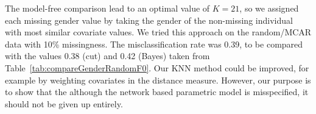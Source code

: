 \documentclass{article}
\begin{document}
%
%

The model-free comparison lead to an optimal value of $K=21$, so we assigned each missing gender value by taking the gender of the non-missing individual with most similar covariate values. We tried this approach on the random/MCAR data with 10\% missingness. The misclassification rate was 0.39, to be compared with the values 0.38 (cut) and 0.42 (Bayes) taken from Table~\ref{tab:compareGenderRandomF0}. Our KNN method could be improved, for example by weighting covariates in the distance measure. However, our purpose is to show that the although the network based parametric model is misspecified, it should not be given up entirely.  
\end{document}
